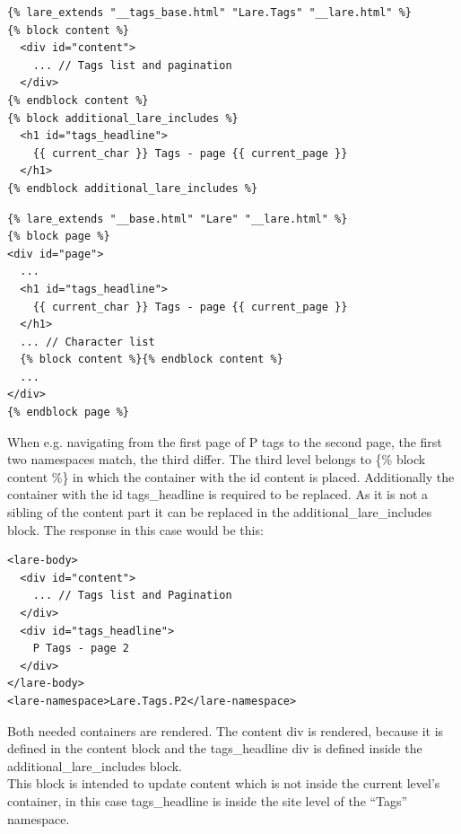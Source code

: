 \begin{minipage}[c]{0.95\linewidth}
\begin{lstlisting}[caption=tags.html, label=lst:tags_template]
{% lare_extends "__tags_base.html" "Lare.Tags" "__lare.html" %}
{% block content %}
  <div id="content">
    ... // Tags list and pagination
  </div>
{% endblock content %}
{% block additional_lare_includes %}
  <h1 id="tags_headline">
    {{ current_char }} Tags - page {{ current_page }}
  </h1>
{% endblock additional_lare_includes %}
\end{lstlisting}
\end{minipage}


\begin{minipage}[c]{0.95\linewidth}
\begin{lstlisting}[caption=\_\_tags\_base.html, label=lst:tags_base_template]
{% lare_extends "__base.html" "Lare" "__lare.html" %}
{% block page %}
<div id="page">
  ...
  <h1 id="tags_headline">
    {{ current_char }} Tags - page {{ current_page }}
  </h1>
  ... // Character list
  {% block content %}{% endblock content %}
  ...
</div>
{% endblock page %}
\end{lstlisting}
\end{minipage}

\noindent{}When e.g. navigating from the first page of P tags to the second page, the first two namespaces match, the third differ.
The third level belongs to \{\% block content \%\} in which the container with the id content is placed.
Additionally the container with the id tags\_headline is required to be replaced. As it is not a sibling of the content part it can be replaced in the additional\_lare\_includes block.
The response in this case would be this:

\begin{minipage}[c]{0.95\linewidth}
\begin{lstlisting}[caption=Example Lare Response, label=lst:lare_response]
<lare-body>
  <div id="content">
    ... // Tags list and Pagination
  </div>
  <div id="tags_headline">
    P Tags - page 2
  </div>
</lare-body>
<lare-namespace>Lare.Tags.P2</lare-namespace>
\end{lstlisting}
\end{minipage}

\noindent{}Both needed containers are rendered.
The content div is rendered, because it is defined in the content block and the tags\_headline div is defined inside the additional\_lare\_includes block.
\\
This block is intended to update content which is not inside the current level's container, in this case tags\_headline is inside the site level of the \enquote{Tags} namespace.

